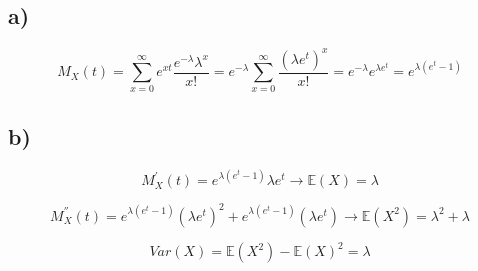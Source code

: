 \documentclass[11pt]{article}
\begin{document}
\subsection*{a)}

$$M_X(t) = \sum_{x=0}^{\infty}e^{xt}\frac{e^{-\lambda}\lambda^x}{x!}=e^{-\lambda}\sum_{x=0}^{\infty}\frac{(\lambda e^{t})^x}{x!}=e^{-\lambda}e^{\lambda e^{t}}=e^{\lambda(e^{t}-1)}$$

\subsection*{b)}

$$M^{'}_X(t) = e^{\lambda(e^t-1)}\lambda e^{t}\rightarrow \mathbb{E}(X) = \lambda$$

$$M^{''}_X(t) = e^{\lambda(e^t-1)}(\lambda e^{t})^2+e^{\lambda(e^t-1)}(\lambda e^{t}) \rightarrow \mathbb{E}(X^2) = \lambda^2+\lambda$$

$$Var(X) = \mathbb{E}(X^2) - \mathbb{E}(X)^2 = \lambda$$
\end{document}
